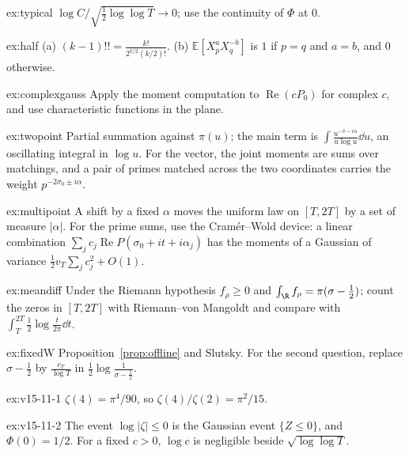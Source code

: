 \begin{hint}{ex:typical}
$\log C/\sqrt{\frac12\log\log T}\to0$; use the continuity of $\Phi$ at $0$.
\end{hint}
\begin{hint}{ex:half}
(a) $(k-1)!!=\frac{k!}{2^{k/2}(k/2)!}$. (b) $\mathbb E[X_p^aX_q^{-b}]$ is $1$ if $p=q$ and $a=b$, and $0$ otherwise.
\end{hint}
\begin{hint}{ex:complexgauss}
Apply the moment computation to $\operatorname{Re}(cP_0)$ for complex $c$, and use characteristic functions in the plane.
\end{hint}
\begin{hint}{ex:twopoint}
Partial summation against $\pi(u)$; the main term is $\int\frac{u^{-\delta-i\alpha}}{u\log u}\dd u$, an oscillating integral in $\log u$. For the vector, the joint moments are sums over matchings, and a pair of primes matched across the two coordinates carries the weight $p^{-2\sigma_0\pm i\alpha}$.
\end{hint}
\begin{hint}{ex:multipoint}
A shift by a fixed $\alpha$ moves the uniform law on $[T,2T]$ by a set of measure $|\alpha|$. For the prime sums, use the Cramér--Wold device: a linear combination $\sum_jc_j\operatorname{Re}P(\sigma_0+it+i\alpha_j)$ has the moments of a Gaussian of variance $\frac12v_T\sum_jc_j^2+O(1)$.
\end{hint}
\begin{hint}{ex:meandiff}
Under the Riemann hypothesis $f_\rho\ge0$ and $\int_\R f_\rho=\pi(\sigma-\frac12)$; count the zeros in $[T,2T]$ with Riemann--von Mangoldt and compare with $\int_T^{2T}\frac12\log\frac t{2\pi}\dd t$.
\end{hint}
\begin{hint}{ex:fixedW}
Proposition~\ref{prop:offline} and Slutsky. For the second question, replace $\sigma-\frac12$ by $\frac{c_T}{\log T}$ in $\frac12\log\frac1{\sigma-\frac12}$.
\end{hint}

\begin{hint}{ex:v15-11-1}
\(\zeta(4)=\pi^4/90\), so \(\zeta(4)/\zeta(2)=\pi^2/15\).
\end{hint}

\begin{hint}{ex:v15-11-2}
The event \(\log|\zeta|\le0\) is the Gaussian event \(\{Z\le0\}\), and \(\Phi(0)=1/2\). For a fixed \(c>0\), \(\log c\) is negligible beside \(\sqrt{\log\log T}\).
\end{hint}

